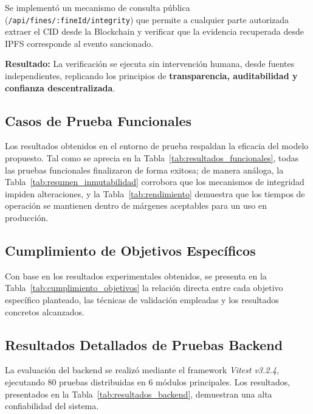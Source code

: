 Se implementó un mecanismo de consulta pública (\texttt{/api/fines/:fineId/integrity}) que permite a cualquier parte autorizada extraer el CID desde la Blockchain y verificar que la evidencia recuperada desde IPFS corresponde al evento sancionado.

\textbf{Resultado:} La verificación se ejecuta sin intervención humana, desde fuentes independientes, replicando los principios de \textbf{transparencia, auditabilidad y confianza descentralizada}.

\subsection{Casos de Prueba Funcionales}



Los resultados obtenidos en el entorno de prueba respaldan la eficacia del modelo propuesto. Tal como se aprecia en la Tabla~\ref{tab:resultados_funcionales}, todas las pruebas funcionales finalizaron de forma exitosa; de manera análoga, la Tabla~\ref{tab:resumen_inmutabilidad} corrobora que los mecanismos de integridad impiden alteraciones, y la Tabla~\ref{tab:rendimiento} demuestra que los tiempos de operación se mantienen dentro de márgenes aceptables para un uso en producción.

\subsection{Cumplimiento de Objetivos Específicos}

Con base en los resultados experimentales obtenidos, se presenta en la Tabla~\ref{tab:cumplimiento_objetivos} la relación directa entre cada objetivo específico planteado, las técnicas de validación empleadas y los resultados concretos alcanzados.



\subsection{Resultados Detallados de Pruebas Backend}

La evaluación del backend se realizó mediante el framework \textit{Vitest v3.2.4}, ejecutando 80 pruebas distribuidas en 6 módulos principales. Los resultados, presentados en la Tabla~\ref{tab:resultados_backend}, demuestran una alta confiabilidad del sistema.




